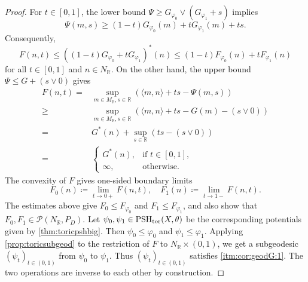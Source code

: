 \begin{proof}
For $t\in[0,1]$, the lower bound $\Psi\geq G_{\varphi_0}\lor(G_{\varphi_1}+s)$ implies
\[
\Psi(m,s)\geq (1-t)G_{\varphi_0}(m)+tG_{\varphi_1}(m)+ts.
\]
Consequently,
\[
F(n,t)\leq \left((1-t)G_{\varphi_0}+tG_{\varphi_1}\right)^*(n)
\leq (1-t)F_{\varphi_0}(n)+tF_{\varphi_1}(n)
\]
for all $t\in [0,1]$ and $n\in N_{\mathbb{R}}$.
On the other hand, the upper bound $\Psi\leq G+(s\lor 0)$ gives
\[
\begin{aligned}
F(n,t)=&\sup_{m\in M_{\mathbb{R}},s\in \mathbb{R}} \left(\langle m,n\rangle +ts-\Psi(m,s)\right)\\
\geq & \sup_{m\in M_{\mathbb{R}},s\in \mathbb{R}} \left(\langle m,n\rangle +ts-G(m)-(s\lor 0)\right)\\
=& G^*(n)+\sup_{s\in \mathbb{R}} \left( ts-(s\lor 0)\right)\\
=&
\begin{cases}
    G^*(n),&\text{if }t\in [0,1],\\
    \infty,&\text{otherwise}.
\end{cases}
\end{aligned}
\]
The convexity of $F$ gives one-sided boundary limits
\[
F_0(n)\coloneqq \lim_{t\to 0+}F(n,t),\quad
F_1(n)\coloneqq \lim_{t\to 1-}F(n,t).
\]
The estimates above give $F_0\leq F_{\varphi_0}$ and $F_1\leq F_{\varphi_1}$, and also show that $F_0,F_1\in \mathcal{P}(N_{\mathbb{R}},P_D)$. Let $\psi_0,\psi_1\in \mathrm{PSH}_{\mathrm{tor}}(X,\theta)$ be the corresponding potentials given by \cref{thm:toricpshbig}. Then $\psi_0\leq\varphi_0$ and $\psi_1\leq\varphi_1$. Applying \cref{prop:toricsubgeod} to the restriction of $F$ to $N_{\mathbb{R}}\times (0,1)$, we get a subgeodesic $(\psi_t)_{t\in (0,1)}$ from $\psi_0$ to $\psi_1$. Thus $(\psi_t)_{t\in (0,1)}$ satisfies \ref{itm:cor:geodG:1}.
The two operations are inverse to each other by construction.
\end{proof}


